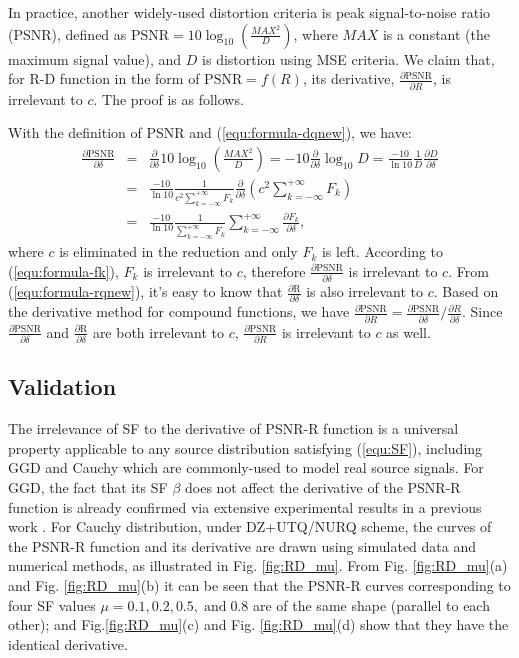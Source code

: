 \documentclass[smallabstract,smallcaptions]{dccpaper}
\begin{document}
In practice, another widely-used distortion criteria is peak signal-to-noise ratio (PSNR), defined as $\textrm{PSNR} = 10 \log_{10}\left(\frac{MAX^2}{D}\right)$, where $MAX$ is a constant (the maximum signal value), and $D$ is distortion using MSE criteria. We claim that, for R-D function in the form of $\textrm{PSNR}=f(R)$, its derivative, $\frac{\partial\textrm{PSNR}}{\partial R}$, is irrelevant to $c$. The proof is as follows.

With the definition of PSNR and (\ref{equ:formula-dqnew}), we have:
{\footnotesize
\begin{eqnarray*}
\frac{\partial\text{PSNR}}{\partial\delta}
&=&\frac{\partial}{\partial\delta}10 \log_{10}\left(\frac{MAX^2}{D}\right)
=-10\frac{\partial}{\partial\delta}\log_{10}D
=\frac{-10}{\ln{10}}\frac{1}{D}\frac{\partial D}{\partial\delta}
\\&=&\frac{-10}{\ln{10}}\frac{1}{c^2 \sum_{k=-\infty}^{+\infty} F_k}\frac{\partial}{\partial\delta} \left(c^2 \sum_{k=-\infty}^{+\infty} F_k\right)
\\&=&\frac{-10}{\ln{10}}\frac{1}{\sum_{k=-\infty}^{+\infty} F_k}\sum_{k=-\infty}^{+\infty} \frac{\partial F_k}{\partial\delta},
\end{eqnarray*}
}where $c$ is eliminated in the reduction and only $F_k$ is left. According to (\ref{equ:formula-fk}), $F_k$ is irrelevant to $c$, therefore $\frac{\partial\textrm{PSNR}}{\partial\delta}$ is irrelevant to $c$. From (\ref{equ:formula-rqnew}), it's easy to know that $\frac{\partial\textrm{R}}{\partial\delta}$ is also irrelevant to $c$. Based on the derivative method for compound functions, we have $\frac{\partial\textrm{PSNR}}{\partial R} = \frac{\partial\textrm{PSNR}}{\partial\delta}/\frac{\partial R}{\partial\delta}$. Since $\frac{\partial\textrm{PSNR}}{\partial\delta}$ and $\frac{\partial\textrm{R}}{\partial\delta}$ are both irrelevant to $c$, $\frac{\partial\textrm{PSNR}}{\partial R}$ is irrelevant to $c$ as well.

\subsection{Validation}

The irrelevance of SF to the derivative of PSNR-R function is a universal property applicable to any source distribution satisfying (\ref{equ:SF}), including GGD and Cauchy which are commonly-used to model real source signals. For GGD, the fact that its SF $\beta$ does not affect the derivative of the PSNR-R function is already confirmed via extensive experimental results in a previous work \cite{Sun_TCSVT2009}. For Cauchy distribution, under DZ+UTQ/NURQ scheme, the curves of the PSNR-R function and its derivative are drawn using simulated data and numerical methods, as illustrated in Fig. \ref{fig:RD_mu}. From Fig. \ref{fig:RD_mu}(a) and Fig. \ref{fig:RD_mu}(b) it can be seen that the PSNR-R curves corresponding to four SF values $\mu = 0.1, 0.2, 0.5, \; \textrm{and} \;0.8$ are of the same shape (parallel to each other); and Fig.\ref{fig:RD_mu}(c) and Fig. \ref{fig:RD_mu}(d) show that they have the identical derivative.
\end{document}
